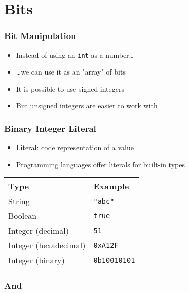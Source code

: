 \section{Bits}
\frame{\tableofcontents[currentsection]}

\begin{frame}
  \frametitle{Bit Manipulation}
  \begin{itemize}
    \item Instead of using an \texttt{int} as a number\dots
    \item \dots we can use it as an "array" of bits
    \item It is possible to use signed integers
    \item But unsigned integers are easier to work with
  \end{itemize}
\end{frame}

\begin{frame}
  \frametitle{Binary Integer Literal}
  \begin{itemize}
    \item Literal: code representation of a value
    \item Programming languages offer literals for built-in types
  \end{itemize}
  \vskip4mm
  \begin{center}
    \begin{tabular}{ll}
      \toprule
      \textbf{Type} & \textbf{Example} \\
      \midrule
      String & \texttt{"abc"} \\
      Boolean & \texttt{true} \\
      Integer (decimal) & \texttt{51} \\
      Integer (hexadecimal) & \texttt{0xA12F} \\
      \color{red} Integer (binary) & \color{red}\texttt{0b10010101} \\
      \bottomrule
    \end{tabular}
  \end{center}
\end{frame}

\subsubsection{And}
\frame{\tableofcontents[currentsubsection]}

